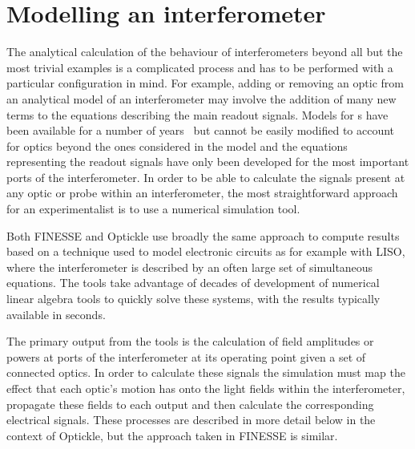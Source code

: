 \section{\label{sec:ifo-modelling}Modelling an interferometer}
The analytical calculation of the behaviour of interferometers beyond all but the most trivial examples is a complicated process and has to be performed with a particular configuration in mind. For example, adding or removing an optic from an analytical model of an interferometer may involve the addition of many new terms to the equations describing the main readout signals. Models for \DRFPMI{}s have been available for a number of years~\cite{Strain2003, Mueller2003, Mason2003} but cannot be easily modified to account for optics beyond the ones considered in the model and the equations representing the readout signals have only been developed for the most important ports of the interferometer. In order to be able to calculate the signals present at any optic or probe within an interferometer, the most straightforward approach for an experimentalist is to use a numerical simulation tool.

Both \gls{FINESSE} and Optickle use broadly the same approach to compute results based on a technique used to model electronic circuits as for example with \gls{LISO}, where the interferometer is described by an often large set of simultaneous equations. The tools take advantage of decades of development of numerical linear algebra tools to quickly solve these systems, with the results typically available in seconds.

The primary output from the tools is the calculation of field amplitudes or powers at ports of the interferometer at its operating point given a set of connected optics. In order to calculate these signals the simulation must map the effect that each optic's motion has onto the light fields within the interferometer, propagate these fields to each output and then calculate the corresponding electrical signals. These processes are described in more detail below in the context of Optickle, but the approach taken in \gls{FINESSE} is similar.

